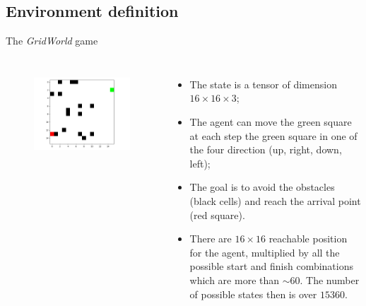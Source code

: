 \documentclass{beamer}
\begin{document}
\subsection{Environment definition}
\begin{frame}{The \textit{GridWorld} game}
	\begin{columns}[c] %
		
\begin{figure}
	\centering
	\includegraphics[width=1.2\textwidth]{game_example}
	\label{fig:game1}
\end{figure}
		
	\begin{itemize}
	\item The state is a tensor of dimension $16 \times 16 \times 3$;
	\item The agent can move the green square at each step the green square in one of the four direction (up, right, down, left);
	\item The goal is to avoid the obstacles (black cells) and reach the arrival point (red square).
	\item There are $16\times16$ reachable position for the agent, multiplied by all the possible start and finish combinations which are more than $\sim 60$. The number of possible states then is over $15360$.
\end{itemize}
		
	\end{columns}
	
	


\end{frame}
\end{document}
